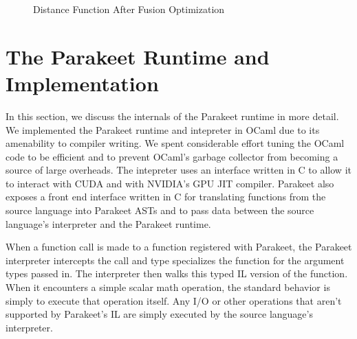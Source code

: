 \documentclass[preprint]{sigplanconf}
\begin{document}
\begin{figure}[h!]

\caption{Distance Function After Fusion Optimization}
\label{DistFuse}
\end{figure}

\section{The Parakeet Runtime and Implementation}
\label{runtime}

In this section, we discuss the internals of the Parakeet runtime in more detail. We implemented the Parakeet runtime and intepreter in OCaml due to its amenability to compiler writing.  We spent considerable effort tuning the OCaml code to be efficient and to prevent OCaml's garbage collector from becoming a source of large overheads. The intepreter uses an interface written in C to allow it to interact with CUDA and with NVIDIA's GPU JIT compiler.  Parakeet also exposes a front end interface written in C for translating functions from the source language into Parakeet ASTs and to pass data between the source language's interpreter and the Parakeet runtime.

When a function call is made to a function registered with Parakeet, the Parakeet interpreter intercepts the call and type specializes the function for the argument types passed in. The interpreter then walks this typed IL version of the function.  When it encounters a simple scalar math operation, the standard behavior is simply to execute that operation itself.  Any I/O or other operations that aren't supported by Parakeet's IL are simply executed by the source language's interpreter.
\end{document}
